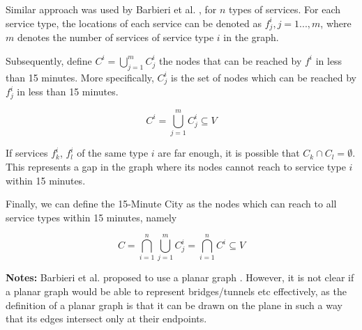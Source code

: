 Similar approach was used by Barbieri et al. \cite{barbieri_graph_2023}, for $n$ types of services. For each service type, the locations of each service can be denoted as $f^i_j,j=1...,m$, where $m$ denotes the number of services of service type $i$ in the graph.

Subsequently, define $C^i=\bigcup\limits_{j=1}^m C^i_j$ the nodes that can be reached by $f^i$ in less than 15 minutes. More specifically, $C^i_j$ is the set of nodes which can be reached by $f^i_j$ in less than 15 minutes.

$$C^i=\bigcup\limits_{j=1}^m C^i_j\subseteq V$$

If services $f^i_k$, $f^i_l$ of the same type $i$ are far enough, it is possible that $C_k\cap C_l=\emptyset$. This represents a gap in the graph where its nodes cannot reach to service type $i$ within 15 minutes.

Finally, we can define the 15-Minute City as the nodes which can reach to all service types within 15 minutes, namely

$$C=\bigcap\limits_{i=1}^n\bigcup\limits_{j=1}^m C^i_j=\bigcap\limits_{i=1}^n C^i\subseteq V$$

\textbf{Notes:} Barbieri et al. proposed to use a planar graph \cite{barbieri_graph_2023}. However, it is not clear if a planar graph would be able to represent bridges/tunnels etc effectively, as the definition of a planar graph is that it can be drawn on the plane in such a way that its edges intersect only at their endpoints.